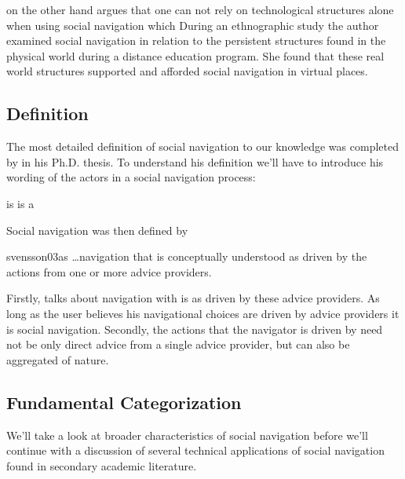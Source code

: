 \citeauthor{robins02} on the other hand argues that one can not rely on
technological structures alone when using social navigation which
During an ethnographic study the author examined social navigation in relation
to the persistent structures found in the physical world during a distance
education program. She found that these real world structures supported and
afforded social navigation in virtual places.

\subsection{Definition}

The most detailed definition of social navigation to our knowledge was
completed by \citet{svensson03} in his Ph.D. thesis. To understand his
definition we'll have to introduce his wording of the actors in a social
navigation process:

\begin{items}
   is 
   is a 
\end{items}

Social navigation was then defined by
\begin{fullquote}[\p{20}]{svensson03}{as}
  \dots navigation that is conceptually understood as driven by the actions
  from one or more advice providers.
\end{fullquote}

Firstly, \citeauthor{svensson03} talks about navigation with is
 as driven by these advice providers. As long as
the user believes his navigational choices are driven by advice providers it
is social navigation. Secondly, the actions that the navigator is driven by
need not be only direct advice from a single advice provider, but can also be
aggregated of nature.

\subsection{Fundamental Categorization}

We'll take a look at broader characteristics of social navigation
before we'll continue with a discussion of several technical applications of
social navigation found in secondary academic literature.

